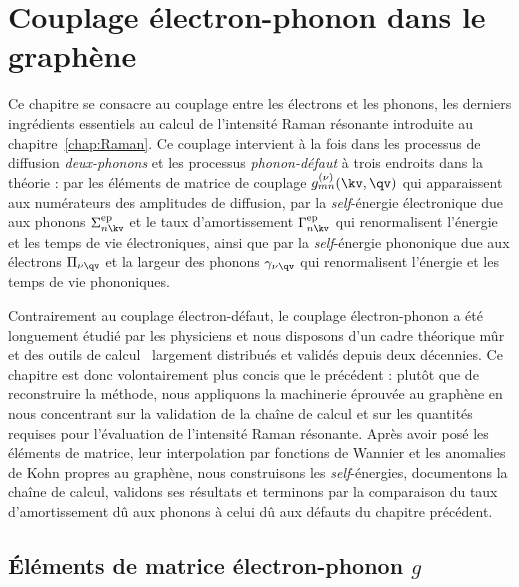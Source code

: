 \chapter{Couplage électron-phonon dans le graphène}\label{chap:eph}

Ce chapitre se consacre au couplage entre les électrons et les phonons, les derniers ingrédients essentiels au calcul de l'intensité Raman résonante introduite au chapitre~\ref{chap:Raman}. Ce couplage intervient à la fois dans les processus de diffusion \textit{deux-phonons} et les processus \textit{phonon-défaut} à trois endroits dans la théorie : par les éléments de matrice de couplage $g_{mn}^{(\nu)}(\kv,\qv)$ qui apparaissent aux numérateurs des amplitudes de diffusion, par la \textit{self}-énergie électronique due aux phonons $\Sigma^\text{ep}_{n\kv}$ et le taux d'amortissement $\Gamma_{n\kv}^\text{ep}$ qui renormalisent l'énergie et les temps de vie électroniques, ainsi que par la \textit{self}-énergie phononique due aux électrons $\Pi_{\nu\qv}$ et la largeur des phonons $\gamma_{\nu\qv}$ qui renormalisent l'énergie et les temps de vie phononiques.

Contrairement au couplage électron-défaut, le couplage électron-phonon a été longuement étudié par les physiciens et nous disposons d'un cadre théorique mûr~\cite{giustinoElectronphononInteractionUsing2007,giustinoElectronphononInteractionsFirst2017} et des outils de calcul~\cite{ponceEPWElectronphononCoupling2016,leeElectronPhononPhysics2023a,zhouPerturboSoftwarePackage2021,gonzeAbinitProjectImpact2020,bruninPhononlimitedElectronMobility2020} largement distribués et validés depuis deux décennies. Ce chapitre est donc volontairement plus concis que le précédent : plutôt que de reconstruire la méthode, nous appliquons la machinerie éprouvée au graphène en nous concentrant sur la validation de la chaîne de calcul et sur les quantités requises pour l'évaluation de l'intensité Raman résonante. Après avoir posé les éléments de matrice, leur interpolation par fonctions de Wannier et les anomalies de Kohn propres au graphène, nous construisons les \textit{self}-énergies, documentons la chaîne de calcul, validons ses résultats et terminons par la comparaison du taux d'amortissement dû aux phonons à celui dû aux défauts du chapitre précédent.

\section{Éléments de matrice électron-phonon $g$}\label{sec:g}

